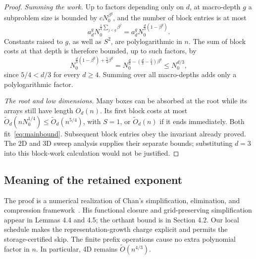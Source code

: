 \documentclass[12pt,a4paper]{article}
\theoremstyle{definition}
\newcommand{\wtO}{\widetilde O}
\begin{document}
\begin{proof}
\emph{Summing the work.} Up to factors depending only on $d$, at
macro-depth $g$ a subproblem size is bounded by $cN_0^{\beta^g}$, and
the number of block entries is at most
\[
 a_d^g N_0^{\frac14\sum_{j<g}\beta^j}
       =a_d^g N_0^{\frac d3(1-\beta^g)}.
\]
Constants raised to $g$, as well as $S^2$, are polylogarithmic in $n$.
The sum of block costs at that depth is therefore bounded, up to such
factors, by
\[
 N_0^{\frac d3(1-\beta^g)+\frac54\beta^g}
  =N_0^{\frac d3-(\frac d3-\frac54)\beta^g}
  \le N_0^{d/3},
\]
since $5/4<d/3$ for every $d\ge4$. Summing over all macro-depths adds
only a polylogarithmic factor.

\emph{The root and low dimensions.} Many boxes can be absorbed at the
root while its arrays still have length $O_d(n)$. Its first block costs
at most $\wtO_d(nN_0^{1/4})\le\wtO_d(n^{5/4})$, with $S=1$, or
$\wtO_d(n)$ if it ends immediately. Both fit~\eqref{eq:mainbound}.
Subsequent block entries obey the invariant already proved. The 2D and
3D sweep analysis supplies their separate bounds; substituting $d=3$
into this block-work calculation would not be justified.
\end{proof}

\subsection{Meaning of the retained exponent}
The proof is a numerical realization of Chan's simplification,
elimination, and compression framework~\cite{chan2013}. His functional
closure and grid-preserving simplification appear in Lemmas 4.4 and 4.5;
the orthant bound is in Section 4.2. Our local schedule makes the
representation-growth charge explicit and permits the storage-certified
skip. The finite prefix operations cause no extra polynomial factor in
$n$. In particular, 4D remains $\wtO(n^{4/3})$.
\end{document}
